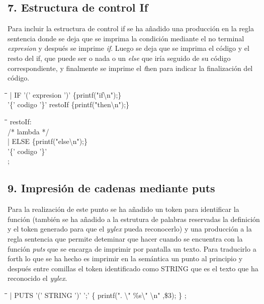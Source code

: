 \documentclass[11pt,spanish]{article}
\begin{document}
		\subsection*{7. Estructura de control If}
		\label{subsec:7}
		Para incluir la estructura de control if se ha añadido una producción en la regla {\ttfamily sentencia} donde se deja que se imprima la condición mediante el no terminal \textit {expresion} y después se imprime \textit {if}. Luego se deja que se imprima el código y el resto del if, que puede ser o nada o un \textit {else} que iría seguido de su código correspondiente, y finalmente se imprime el {\textit then} para indicar la finalización del código.
		\begin{tabbing}
			\hspace*{1cm}\=\hspace*{1cm}\= \hspace*{8cm}\=\kill
			\>| IF '(' expresion ')'\>\> \{printf("if\textbackslash n");\}\\
			\>\>'\{' codigo '\}' restoIf\> \{printf("then\textbackslash n");\}\\
		\end{tabbing}
		\begin{tabbing}
			\hspace*{1cm}\=\hspace*{1cm}\= \hspace*{8cm}\=\kill
			restoIf:\\
			\>/* lambda */ \\
			\>| ELSE\>\> \{printf("else\textbackslash n");\}\\
			\>\>'\{' codigo '\}'\\
			;
		\end{tabbing}
		\subsection*{9. Impresión de cadenas mediante puts}
		\label{subsec:9}
		\addcontentsline{toc}{subsection}{\nameref{subsec:9}}
		Para la realización de este punto se ha añadido un token para identificar la función (también se ha añadido a la estrutura de palabras reservadas la definición y el token generado para que el \textit {yylex} pueda reconocerlo) y una producción a la regla {\ttfamily sentencia} que permite deteminar que hacer cuando se encuentra con la función \textit {puts} que se encarga de imprimir por pantalla un texto. Para traducirlo a forth lo que se ha hecho es imprimir en la semántica un punto al principio y después entre comillas el token identificado como STRING que es el texto que ha reconocido el \textit {yylex}.
		\begin{tabbing}
			\hspace*{1cm}\=\hspace*{1cm}\= \hspace*{4cm}\=\kill
			\>| PUTS '(' STRING ')' ';'\> \>		\{ printf(". \textbackslash "  \%s\textbackslash " \textbackslash n" ,\$3); \}
			;
		\end{tabbing}
\end{document}
